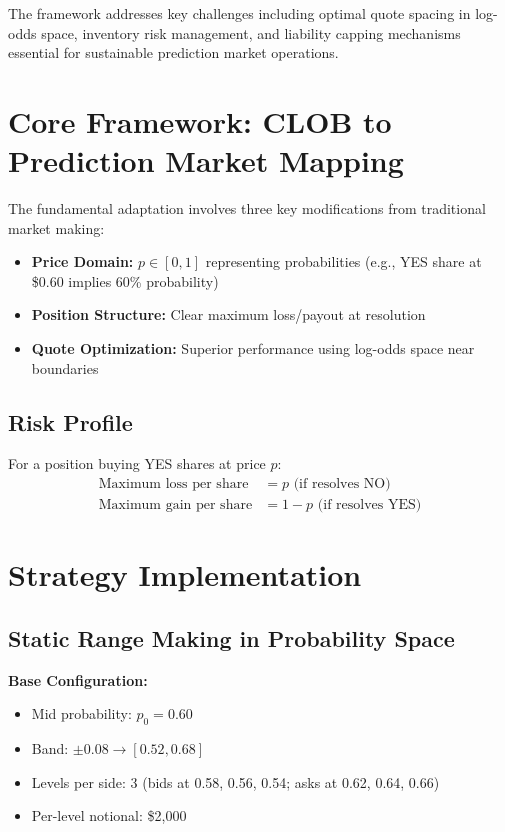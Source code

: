 \documentclass[11pt]{article}
\begin{document}
The framework addresses key challenges including optimal quote spacing in log-odds space, inventory risk management, and liability capping mechanisms essential for sustainable prediction market operations.

\section{Core Framework: CLOB to Prediction Market Mapping}

The fundamental adaptation involves three key modifications from traditional market making:

\begin{itemize}
    \item \textbf{Price Domain:} $p \in [0,1]$ representing probabilities (e.g., YES share at \$0.60 implies 60\% probability)
    \item \textbf{Position Structure:} Clear maximum loss/payout at resolution
    \item \textbf{Quote Optimization:} Superior performance using log-odds space near boundaries
\end{itemize}

\subsection{Risk Profile}
For a position buying YES shares at price $p$:
\begin{align}
\text{Maximum loss per share} &= p \text{ (if resolves NO)} \\
\text{Maximum gain per share} &= 1-p \text{ (if resolves YES)}
\end{align}

\section{Strategy Implementation}

\subsection{Static Range Making in Probability Space}

\textbf{Base Configuration:}
\begin{itemize}
    \item Mid probability: $p_0 = 0.60$
    \item Band: $\pm 0.08 \rightarrow [0.52, 0.68]$
    \item Levels per side: 3 (bids at 0.58, 0.56, 0.54; asks at 0.62, 0.64, 0.66)
    \item Per-level notional: \$2,000
\end{itemize}
\end{document}
